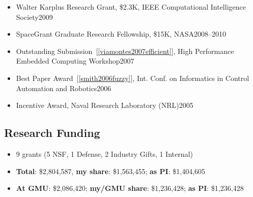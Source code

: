 \documentclass[11pt]{article}
\begin{document}
\begin{itemize}
      \item Walter Karplus Research Grant, \$2.3K, IEEE Computational Intelligence Society\hfill 2009
      \item SpaceGrant Graduate Research Fellowship, \$15K, NASA\hfill 2008--2010
      \item Outstanding Submission~[\ref{viamontes2007efficient}], High Performance Embedded Computing Workshop\hfill 2007
      \item  Best Paper Award~[\ref{smith2006fuzzy}],  Int. Conf. on Informatics in Control Automation and Robotics\hfill 2006
      \item Incentive Award,  Naval Research Laboratory (NRL)\hfill 2005
    \end{itemize}


    \subsection{Research Funding}
    \begin{itemize}[label={},before=\small]
      \item 9 grants (5 NSF, 1 Defense, 2 Industry Gifts, 1 Internal)

      \item \textbf{Total}: \$2,804,587, \textbf{my share}: \$1,563,455;  \textbf{as PI}: \$1,404,605
      \item \textbf{At GMU}: \$2,086,420; \textbf{my/GMU share}: \$1,236,428; \textbf{as PI}: \$1,236,428
    \end{itemize}
\end{document}
